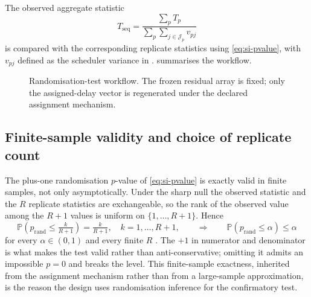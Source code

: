 \documentclass[11pt,a4paper]{article}
\theoremstyle{definition}
\newcommand{\Apre}{A_{\mathrm{pre}}}
\newcommand{\tauL}{\tau_L}
\begin{document}
The observed aggregate statistic
\[
T_{\mathrm{seq}}
=
\frac{\sum_p T_p}{\sum_p\sum_{j\in\mathcal{J}_p} v_{pj}}
\]
is compared with the corresponding replicate statistics using
\eqref{eq:si-pvalue}, with \(v_{pj}\) defined as the scheduler variance in
.  summarises the workflow.

\begin{figure}[t]
\centering
{}
\caption{Randomisation-test workflow. The frozen residual array is fixed; only
the assigned-delay vector is regenerated under the declared assignment
mechanism.}
\label{fig:si-randtest}
\end{figure}

\subsection{Finite-sample validity and choice of replicate count}
\label{sec:si-pvalue-finite}

The plus-one randomisation \(p\)-value of \eqref{eq:si-pvalue} is exactly valid in
finite samples, not only asymptotically. Under the sharp null the observed
statistic and the \(R\) replicate statistics are exchangeable, so the rank of the
observed value among the \(R+1\) values is uniform on \(\{1,\dots,R+1\}\). Hence
\begin{equation}
\label{eq:si-pvalue-superuniform}
\mathbb{P}\!\left(p_{\mathrm{rand}}\le\tfrac{k}{R+1}\right)=\tfrac{k}{R+1},
\quad k=1,\dots,R+1,
\qquad\Longrightarrow\qquad
\mathbb{P}\!\left(p_{\mathrm{rand}}\le\alpha\right)\le\alpha
\end{equation}
for every \(\alpha\in(0,1)\) and every finite \(R\) \citep{PhipsonSmyth2010}. The
\(+1\) in numerator and denominator is what makes the test valid rather than
anti-conservative; omitting it admits an impossible \(p=0\) and breaks the level.
This finite-sample exactness, inherited from the assignment mechanism rather than
from a large-sample approximation, is the reason the design uses randomisation
inference for the confirmatory test.
\end{document}
